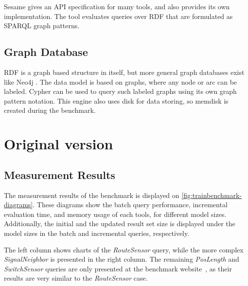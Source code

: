 Sesame gives an API specification for many tools, and also provides its own implementation. The tool evaluates queries over RDF that are formulated as SPARQL \cite{Sparql} graph patterns.


\subsection{Graph Database}
RDF is a graph based structure in itself, but more general graph databases exist like Neo4j \cite{neo4j}. The data model is based on graphs, where any node or arc can be labeled. Cypher can be used to query such labeled graphs using its own graph pattern notation. This engine also uses disk for data storing, so memdisk is created during the benchmark.

\section{Original version}


\subsection{Measurement Results}
\label{sec:results}

The measurement results of the benchmark is displayed on
\autoref{fig:trainbenchmark-diagrams}. These diagrams show the batch query
performance, incremental evaluation time, and memory usage of each tools, for
different model sizes. Additionally, the initial and the updated result set size
is displayed under the model sizes in the batch and incremental queries,
respectively.

The left column shows charts of the \emph{RouteSensor} query,
while the more complex \emph{SignalNeighbor} is presented in the right column.
The remaining \emph{PosLength} and \emph{SwitchSensor} queries are only presented
at the benchmark website~\cite{TBwebsite}, as their results are very similar to the
\emph{RouteSensor} case.

